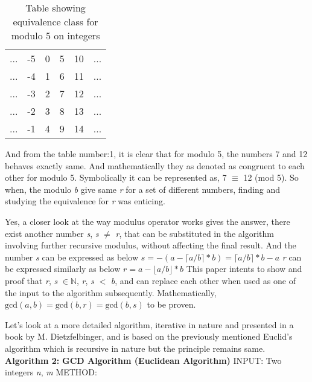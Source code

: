 \documentclass[conference,compsoc]{IEEEtran}
\newcommand{\N}{{\mathbb N}}
\newcommand{\var}[1]{\textit{#1}}
\renewcommand{\gcd}{\text{gcd}}
\newcommand{\ceil}[1]{\lceil#1\rceil}
\newcommand{\floor}[1]{\lfloor#1\rfloor}
\begin{document}
\begin{table}[!htbp]
\renewcommand{\arraystretch}{1.3}
\caption{Table showing equivalence class for modulo 5 on integers}
\label{table:1}
\centering
	\begin{tabular}{c c c c c c}
		... & -5 & 0 & 5 & 10 & ... \\
		... & -4 & 1 & 6 & 11 & ... \\
		... & -3 & 2 & 7 & 12 & ... \\
		... & -2 & 3 & 8 & 13 & ... \\
		... & -1 & 4 & 9 & 14 & ...
	\end{tabular}
\end{table}

And from the table number:1, it is clear that for modulo 5, the numbers 7 and 12 behaves exactly same. And mathematically they as denoted as congruent to each other for modulo 5.
Symbolically it can be represented as, 7 $\equiv$ 12 (mod 5).
So when, the modulo \var{b} give same \var{r} for a set of different numbers, finding and studying the equivalence for \var{r} was enticing.

Yes, a closer look at the way modulus operator works gives the answer, there exist another  number \var{s}, \var{s} $\neq$ \var{r}, that can be substituted in the algorithm involving further recursive modulus, without affecting the final result. And the number \textit{s} can be expressed as below
\newline $s = -(a-\ceil{a/b}*b) = \ceil{a/b}*b - a$
\newline \textit{r} can be expressed similarly as below
\newline $r = a - \floor{a/b}*b$
\newline This paper intents to show and proof that \textit{r}, \textit{s} $\in \N$, \textit{r}, \textit{s} $<$ \textit{b}, and can replace each other when used as one of the input to the algorithm subsequently. Mathematically, $\gcd(a,b) =\gcd(b,r) = \gcd(b,s)$ to be proven.


Let's look at a more detailed algorithm, iterative in nature and presented in a book by M. Dietzfelbinger, and is based on the previously mentioned Euclid's algorithm which is recursive in nature but the principle remains same.
\newline
\newline \textbf{Algorithm 2:}
\newline \textbf{GCD Algorithm (Euclidean Algorithm)}
\newline INPUT: Two integers \var{n}, \var{m}
\newline METHOD:
\end{document}

